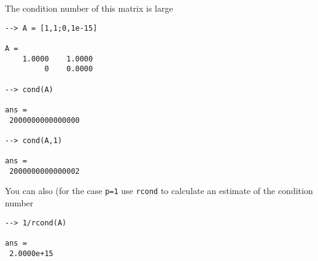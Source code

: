 The condition number of this matrix is large
\begin{verbatim}
--> A = [1,1;0,1e-15]

A = 
    1.0000    1.0000 
         0    0.0000 

--> cond(A)

ans = 
 2000000000000000 

--> cond(A,1)

ans = 
 2000000000000002 
\end{verbatim}
You can also (for the case \verb|p=1| use \verb|rcond| to calculate an estimate
of the condition number
\begin{verbatim}
--> 1/rcond(A)

ans = 
 2.0000e+15 
\end{verbatim}
